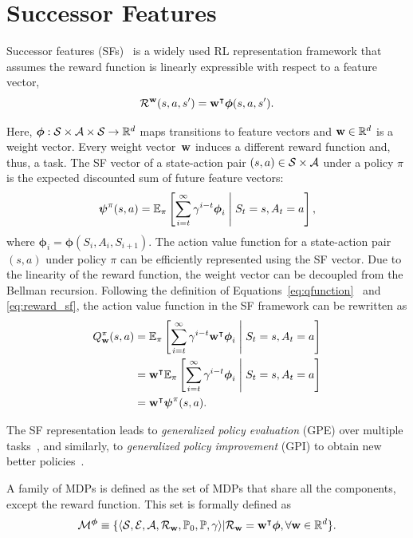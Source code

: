 \section{Successor Features}

Successor features (SFs)~\citep{Dayan1993, Barreto2017} is a widely used RL representation framework that assumes the reward function is linearly expressible with respect to a feature vector,
\begin{equation}
  \mathcal{R}^{\mathbf{w}}(s, a, s') = \mathbf{w}^\intercal\boldsymbol\phi(s, a , s').
  \label{eq:reward_sf}
\end{equation}

Here, $\boldsymbol\phi:\mathcal{S}\times\mathcal{A}\times\mathcal{S}\rightarrow\mathbb{R}^{d}$ maps transitions to feature vectors and $\mathbf{w}\in\mathbb{R}^d$ is a weight vector. Every weight vector~$\mathbf{w}$ induces a different reward function and, thus, a task. The SF vector of a state-action pair $(s,a)\in\mathcal{S}\times\mathcal{A}$ under a policy $\pi$ is the expected discounted sum of future feature vectors: 
\begin{equation}
  \boldsymbol{\mathbf{\psi}}^\pi(s, a) = \mathbb{E}_{\pi}\left[\sum_{i=t}^\infty \gamma^{i-t} \boldsymbol\phi_i\;\middle\lvert\;S_t = s, A_t = a\right],
  \label{eq:sf}
\end{equation}
where $\boldsymbol\phi_i = \boldsymbol\phi(S_{i}, A_{i}, S_{i+1})$. The action value function for a state-action pair $(s, a)$ under policy $\pi$ can be efficiently represented using the SF vector. Due to the linearity of the reward function, the weight vector can be decoupled from the Bellman recursion. Following the definition of Equations~\eqref{eq:qfunction}~ and \eqref{eq:reward_sf}, the action value function in the SF framework can be rewritten as
\begin{align}
  Q^\pi_{\mathbf{w}}(s, a) &= \mathbb{E}_{\pi}\left[\sum_{i=t} ^\infty \gamma^{i-t} \mathbf{w}^\intercal\boldsymbol\phi_i\;\middle\lvert\;S_t = s, A_t = a\right] \nonumber \\
                 & = \mathbf{w}^\intercal\mathbb{E}_{\pi}\left[\sum_{i=t} ^\infty \gamma^{i-t} \boldsymbol\phi_i\;\middle\lvert\;S_t = s, A_t = a\right] \nonumber \\
                 &=  \mathbf{w}^\intercal \boldsymbol{\mathbf{\psi}}^\pi(s, a) .
\label{eq:qfunction_sf}
\end{align}

The SF representation leads to \textit{generalized policy evaluation} (GPE) over multiple tasks~\citep{Barreto2020a}, and similarly, to \textit{generalized policy improvement} (GPI) to obtain new better policies~\citep{Barreto2017}.

A family of MDPs is defined as the set of MDPs that share all the components, except the reward function. This set is formally defined as 
\begin{equation*}
    \mathcal{M}^{\boldsymbol{\phi}}\equiv\{\langle\mathcal{S},\mathcal{E},\mathcal{A},\mathcal{R}_{\mathbf{w}},\mathbb{P}_0, \mathbb{P},\gamma\rangle \lvert \mathcal{R}_{\mathbf{w}} = \mathbf{w}^\intercal \boldsymbol{\phi}, \forall\mathbf{w}\in\mathbb{R}^d\}.
\end{equation*}

